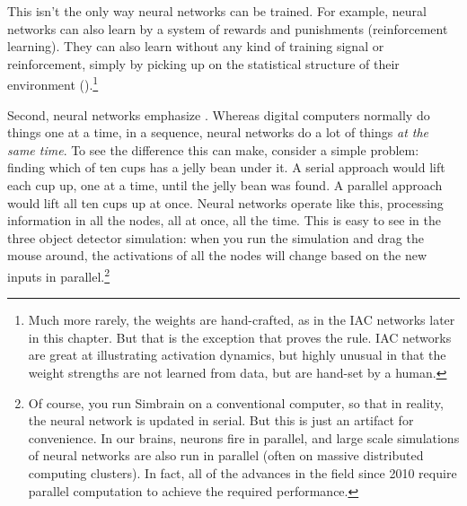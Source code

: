 This isn't the only way neural networks can be trained. For example, neural networks can also learn by a system of rewards and punishments (reinforcement learning). They can also learn without any kind of training signal or reinforcement, simply by picking up on the statistical structure of their environment ().\footnote{Much more rarely, the weights are hand-crafted, as in the IAC networks later in this chapter. But that is the exception that proves the rule. IAC networks are great at illustrating activation dynamics, but highly unusual in that the weight strengths are not learned from data, but are hand-set by a human.}

Second, neural networks emphasize . Whereas digital computers normally do things one at a time, in a sequence, neural networks do a lot of things  \emph{at the same time}. To see the difference this can make, consider a simple problem: finding which of ten cups has a jelly bean under it. A serial approach would lift each cup up, one at a time, until the jelly bean was found. A parallel approach would lift all ten cups up at once. Neural networks operate like this, processing information in all the nodes, all at once, all the time. This is easy to see  in the three object detector simulation: when you run the simulation and drag the mouse around, the activations of all the nodes will change based on the new inputs in parallel.\footnote{Of course, you run Simbrain on a conventional computer, so that in reality, the neural network is updated in serial. But this is just an artifact for convenience. In our brains, neurons fire in parallel, and large scale simulations of neural networks are also run in parallel (often on massive distributed computing clusters). In fact, all of the advances in the field since 2010 require parallel computation to achieve the required performance.} 

